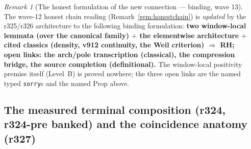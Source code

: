 \documentclass[11pt]{article}
\theoremstyle{definition}
\theoremstyle{remark}
\newtheorem{remark}[theorem]{Remark}
\begin{document}
\begin{remark}[The honest formulation of the new connection ---
binding, wave 13]\label{rem:honestchain-v970}
The wave-12 honest chain reading (Remark~\ref{rem:honestchain})
is \emph{updated} by the r325/r326 architecture to the following
binding formulation: \textbf{two window-local lemmata (over the
canonical family) $+$ the elementwise architecture $+$ cited
classics (density, v912 continuity, the Weil criterion)
$\Rightarrow$ RH; open links: the arch/pole transcription
(classical), the compression bridge, the source completion
(definitional).}  The window-local positivity premise itself
(Level~B) is proved nowhere; the three open links are the named
typed \texttt{sorry}s and the named Prop above.
\end{remark}

\subsection{The measured terminal composition (r324, r324-pre
banked) and the coincidence anatomy (r327)}
\label{sec:measured-composition}
\end{document}
